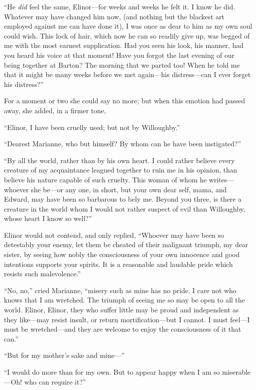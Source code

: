 ``He \emph{did} feel the same, Elinor---for weeks and weeks he
felt it.  I know he did.  Whatever may have changed him now, (and
nothing but the blackest art employed against me can have done
it), I was once as dear to him as my own soul could wish.
This lock of hair, which now he can so readily give up,
was begged of me with the most earnest supplication.
Had you seen his look, his manner, had you heard his voice
at that moment!  Have you forgot the last evening of our
being together at Barton?  The morning that we parted
too!  When he told me that it might be many weeks before
we met again---his distress---can I ever forget his distress?''

For a moment or two she could say no more;
but when this emotion had passed away, she added,
in a firmer tone,

``Elinor, I have been cruelly used; but not by Willoughby.''

``Dearest Marianne, who but himself?  By whom can he
have been instigated?''

``By all the world, rather than by his own heart.
I could rather believe every creature of my acquaintance
leagued together to ruin me in his opinion, than believe
his nature capable of such cruelty.  This woman of whom he
writes---whoever she be---or any one, in short, but your own
dear self, mama, and Edward, may have been so barbarous
to bely me.  Beyond you three, is there a creature
in the world whom I would not rather suspect of evil
than Willoughby, whose heart I know so well?''

Elinor would not contend, and only replied,
``Whoever may have been so detestably your enemy, let them
be cheated of their malignant triumph, my dear sister,
by seeing how nobly the consciousness of your own
innocence and good intentions supports your spirits.
It is a reasonable and laudable pride which resists
such malevolence.''

``No, no,'' cried Marianne, ``misery such as mine has
no pride.  I care not who knows that I am wretched.
The triumph of seeing me so may be open to all the world.
Elinor, Elinor, they who suffer little may be proud and
independent as they like---may resist insult, or return
mortification---but I cannot.  I must feel---I must be
wretched---and they are welcome to enjoy the consciousness
of it that can.''

``But for my mother's sake and mine---''

``I would do more than for my own.  But to appear
happy when I am so miserable---Oh! who can require it?''

